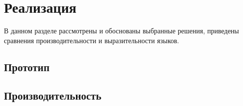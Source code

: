 \section{Реализация}
В данном разделе рассмотрены и обоснованы выбранные решения, приведены сравнения производительности и выразительности языков.

\subsection{Прототип}
\subsection{Производительность}
